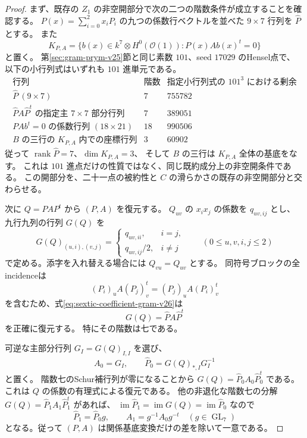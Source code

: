 \begin{proof}
まず、既存の $Z_1$ の非空開部分で次の二つの階数条件が成立することを確認する。
$P(x)=\sum_{i=0}^2x_iP_i$ の九つの係数行ベクトルを並べた
$9\times7$ 行列を $\widehat P$ とする。
また
\[
 K_{P,A}=\{b(x)\in k^7\otimes H^0(\mathcal O(1)):
                              P(x)A b(x)^t=0\}
\]
と置く。
第\ref{sec:gram-prym-v25}節と同じ素数 $101$、seed $17029$ のHensel点で、
以下の小行列式はいずれも $101$ 進単元である。
\[
\begin{array}{c|c|c}
 \text{行列}&\text{階数}&\text{指定小行列式の }101^3\text{ における剰余}\\\hline
 \widehat P\ (9\times7)&7&755782\\
 \widehat P A\widehat P^t\text{ の指定主 }7\times7\text{ 部分行列}&7&389051\\
 PAb^t=0\text{ の係数行列 }(18\times21)&18&990506\\
 B\text{ の三行の }K_{P,A}\text{ 内での座標行列}&3&60902
\end{array}
\]
従って $\operatorname{rank}\widehat P=7$、$\dim K_{P,A}=3$、
そして $B$ の三行は $K_{P,A}$ 全体の基底をなす。
これは $101$ 進点だけの性質ではなく、同じ既約成分上の非空開条件である。
この開部分を、二十一点の被約性と $C$ の滑らかさの既存の非空開部分と交わらせる。

次に $Q=PAP^t$ から $(P,A)$ を復元する。
$Q_{uv}$ の $x_i x_j$ の係数を $q_{uv,ij}$ とし、
九行九列の行列 $G(Q)$ を
\begin{equation}\label{eq:sextic-coefficient-gram-v26}
 G(Q)_{(u,i),(v,j)}=
 \begin{cases}
  q_{uv,ii},&i=j,\\
  q_{uv,ij}/2,&i\ne j
 \end{cases}
 \qquad (0\le u,v,i,j\le2)
\end{equation}
で定める。添字を入れ替える場合には $Q_{vu}=Q_{uv}$ とする。
同符号ブロックの全incidenceは
\[
 (P_i)_u A(P_j)_v^t=(P_j)_u A(P_i)_v^t
\]
を含むため、式\eqref{eq:sextic-coefficient-gram-v26}は
\[
 G(Q)=\widehat P A\widehat P^t
\]
を正確に復元する。
特にその階数は七である。

可逆な主部分行列 $G_I=G(Q)_{I,I}$ を選び、
\begin{equation}\label{eq:sextic-rational-factorization-v26}
 A_0=G_I,\qquad
 \widehat P_0=G(Q)_{*,I}G_I^{-1}
\end{equation}
と置く。
階数七のSchur補行列が零になることから
$G(Q)=\widehat P_0A_0\widehat P_0^t$ である。
これは $Q$ の係数の有理式による復元である。
他の非退化な階数七の分解
$G(Q)=\widehat P_1A_1\widehat P_1^t$ があれば、
$\operatorname{im}\widehat P_1=\operatorname{im}G(Q)
=\operatorname{im}\widehat P_0$ なので
\[
 \widehat P_1=\widehat P_0g,\qquad
 A_1=g^{-1}A_0g^{-t}
 \quad(g\in\operatorname{GL}_7)
\]
となる。従って $(P,A)$ は関係基底変換だけの差を除いて一意である。


\end{proof}
